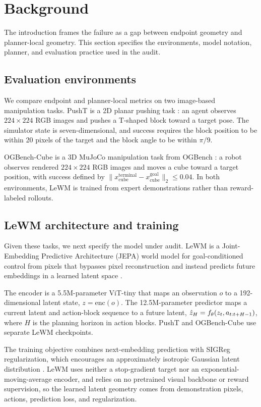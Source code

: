 \section{Background}

The introduction frames the failure as a gap between endpoint geometry and planner-local geometry. This section specifies the environments, model notation, planner, and evaluation practice used in the audit.

\subsection{Evaluation environments}

We compare endpoint and planner-local metrics on two image-based manipulation tasks. PushT is a 2D planar pushing task \citep{pusht2023}: an agent observes $224\times224$ RGB images and pushes a T-shaped block toward a target pose. The simulator state is seven-dimensional, and success requires the block position to be within 20 pixels of the target and the block angle to be within $\pi/9$.

OGBench-Cube is a 3D MuJoCo manipulation task from OGBench \citep{ogbench2024}: a robot observes rendered $224\times224$ RGB images and moves a cube toward a target position, with success defined by $\lVert x_\mathrm{cube}^{\mathrm{terminal}} - x_\mathrm{cube}^{\mathrm{goal}}\rVert_2 \leq 0.04$. In both environments, LeWM is trained from expert demonstrations rather than reward-labeled rollouts.

\subsection{LeWM architecture and training}

Given these tasks, we next specify the model under audit. LeWM is a Joint-Embedding Predictive Architecture (JEPA) world model for goal-conditioned control from pixels that bypasses pixel reconstruction and instead predicts future embeddings in a learned latent space \citep{lewm2025}.

The encoder is a 5.5M-parameter ViT-tiny that maps an observation $o$ to a 192-dimensional latent state, $z=\mathrm{enc}(o)$. The 12.5M-parameter predictor maps a current latent and action-block sequence to a future latent, $\hat{z}_H = f_\theta(z_t, a_{t:t+H-1})$, where $H$ is the planning horizon in action blocks. PushT and OGBench-Cube use separate LeWM checkpoints.

The training objective combines next-embedding prediction with SIGReg regularization, which encourages an approximately isotropic Gaussian latent distribution \citep{sigr2024}. LeWM uses neither a stop-gradient target nor an exponential-moving-average encoder, and relies on no pretrained visual backbone or reward supervision, so the learned latent geometry comes from demonstration pixels, actions, prediction loss, and regularization.

